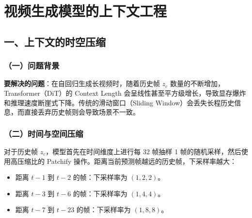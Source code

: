 \setcounter{section}{6}

\hypertarget{ux89c6ux9891ux751fux6210ux6a21ux578bux7684ux4e0aux4e0bux6587ux5de5ux7a0b}{%
\section{视频生成模型的上下文工程}\label{ux89c6ux9891ux751fux6210ux6a21ux578bux7684ux4e0aux4e0bux6587ux5de5ux7a0b}}

\hypertarget{ux4e00ux4e0aux4e0bux6587ux7684ux65f6ux7a7aux538bux7f29}{%
\subsection{一、上下文的时空压缩}\label{ux4e00ux4e0aux4e0bux6587ux7684ux65f6ux7a7aux538bux7f29}}

\hypertarget{ux4e00ux95eeux9898ux80ccux666f-5}{%
\subsubsection{（一）问题背景}\label{ux4e00ux95eeux9898ux80ccux666f-5}}

\textbf{要解决的问题}：在自回归生成长视频时，随着历史帧 \(z_c\) 数量的不断增加，Transformer（DiT）的 Context Length 会呈线性甚至平方级增长，导致显存爆炸和推理速度断崖式下降。传统的滑动窗口（Sliding Window）会丢失长程历史信息，而直接丢弃历史帧则会导致场景不一致。

\hypertarget{ux4e8cux65f6ux95f4ux4e0eux7a7aux95f4ux538bux7f29}{%
\subsubsection{（二）时间与空间压缩}\label{ux4e8cux65f6ux95f4ux4e0eux7a7aux95f4ux538bux7f29}}

对于历史帧 \(z_c\)，模型首先在时间维度上进行每 32 帧抽样 1 帧的随机采样，然后使用高压缩比的 Patchify 操作。距离当前预测帧越远的历史帧，下采样率越大：

\begin{itemize}
\tightlist
\item
  距离 \(t-1\) 到 \(t-2\) 的帧：下采样率为 \((1,2,2)\)。
\item
  距离 \(t-3\) 到 \(t-6\) 的帧：下采样率为 \((1,4,4)\)。
\item
  距离 \(t-7\) 到 \(t-23\) 的帧：下采样率为 \((1,8,8)\)。
\end{itemize}


